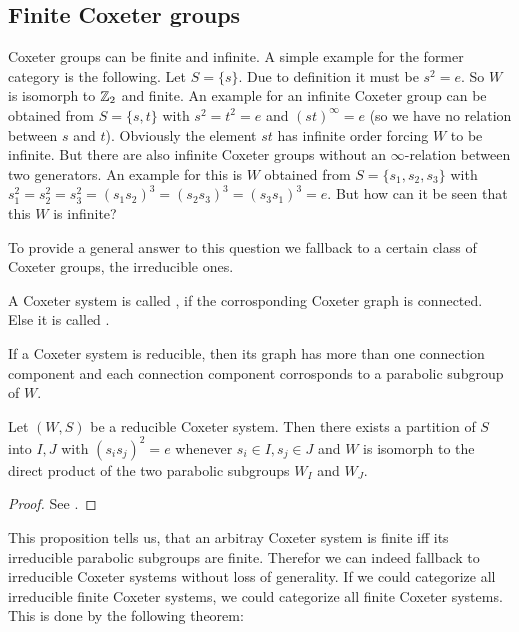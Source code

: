 \subsection{Finite Coxeter groups}

Coxeter groups can be finite and infinite. A simple example for the former category is the following. Let $S = \{ s \}$. Due to definition it must be $s^2 = e$. So $W$ is isomorph to $\mathbb{Z}_2$ and finite. An example for an infinite Coxeter group can be obtained from $S = \{s,t\}$ with $s^2=t^2=e$ and $(st)^\infty = e$ (so we have no relation between $s$ and $t$). Obviously the element $st$ has infinite order forcing $W$ to be infinite. But there are also infinite Coxeter groups without an $\infty$-relation between two generators. An example for this is $W$ obtained from $S=\{s_1,s_2,s_3\}$ with $s_1^2=s_2^2=s_3^2=(s_1 s_2)^3=(s_2 s_3)^3=(s_3 s_1)^3=e$. But how can it be seen that this $W$ is infinite?

To provide a general answer to this question we fallback to a certain class of Coxeter groups, the irreducible ones.

\begin{defi}
	A Coxeter system is called , if the corrosponding Coxeter graph is connected. Else it is called .
\end{defi}

If a Coxeter system is reducible, then its graph has more than one connection component and each connection component corrosponds to a parabolic subgroup of $W$. 

\begin{prop}
	Let $(W,S)$ be a reducible Coxeter system. Then there exists a partition of $S$ into $I,J$ with $(s_i s_j)^2 = e$ whenever $s_i \in I, s_j \in J$ and $W$ is isomorph to the direct product of the two parabolic subgroups $W_I$ and $W_J$.

	\begin{proof}
		See \cite[Proposition 6.1]{humphreys:coxeter}.
	\end{proof}
\end{prop}

This proposition tells us, that an arbitray Coxeter system is finite iff its irreducible parabolic subgroups are finite. Therefor we can indeed fallback to irreducible Coxeter systems without loss of generality. If we could categorize all irreducible finite Coxeter systems, we could categorize all finite Coxeter systems. This is done by the following theorem:

